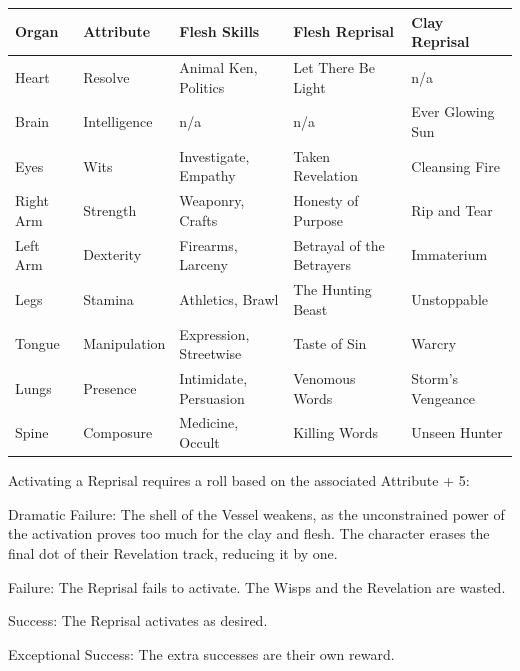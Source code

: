 \begin{multicols}{2}
\bigsidebarstart
    \centering \begin{tabulary}{1\linewidth}{|L|L|L|L|L|}
        \hline
        Organ     & Attribute    & Flesh Skills            & Flesh Reprisal             & Clay Reprisal      \\ \hline
        Heart     & Resolve      & Animal Ken, Politics    & Let There Be Light         & 	n/a               \\ \hline
        Brain     & Intelligence & 	n/a                    & 	n/a                       & Ever Glowing Sun   \\ \hline
        Eyes      & Wits         & Investigate, Empathy    & Taken Revelation           & Cleansing Fire     \\ \hline
        Right Arm & Strength     & Weaponry, Crafts        & Honesty of Purpose         & Rip and Tear       \\ \hline
        Left Arm  & Dexterity    & Firearms, Larceny       & Betrayal of the Betrayers  & Immaterium         \\ \hline
        Legs      & Stamina      & Athletics, Brawl        & The Hunting Beast          & Unstoppable        \\ \hline
        Tongue    & Manipulation & Expression, Streetwise  & Taste of Sin        & Warcry  \\ \hline
        Lungs     & Presence     & Intimidate, Persuasion  & Venomous Words             & Storm’s Vengeance  \\ \hline
        Spine     & Composure    & Medicine, Occult     & Killing Words              & Unseen Hunter      \\
        \hline
    \end{tabulary}
\bigsidebarend

Activating a Reprisal requires a roll based on the associated Attribute + 5:

    \begin{myindentpar}{10pt}Dramatic Failure: The shell of the Vessel weakens, as the unconstrained power of the activation proves too much for the clay and flesh. The character erases the final dot of their Revelation track, reducing it by one.  
    
    Failure: The Reprisal fails to activate. The Wisps and the Revelation are wasted. 
    
    Success: The Reprisal activates as desired. 
    
    Exceptional Success: The extra successes are their own reward. \end{myindentpar}
    

\end{multicols}
